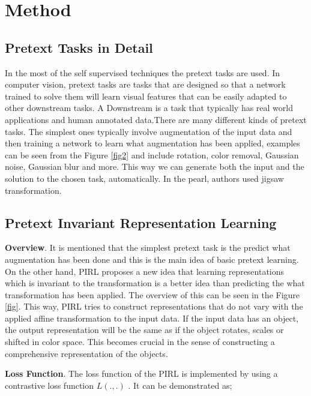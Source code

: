 \documentclass[conference]{IEEEtran}
\begin{document}
\section{Method}
\subsection{Pretext Tasks in Detail}
In the most of the self supervised techniques the pretext tasks are used. In computer vision, pretext tasks are tasks that are designed so that a network trained to solve them will learn visual features that can be easily adapted to other downstream tasks. A Downstream is a task that typically has real world applications and human annotated data.There are many different kinds of pretext tasks. The simplest ones typically involve augmentation of the input data and then training a network to learn what augmentation has been applied, examples can be seen from the Figure \ref{fig2} and include rotation, color removal, Gaussian noise, Gaussian blur and more. This way we can generate both the input and the solution to the chosen task, automatically. In the pearl, authors used jigsaw transformation.

\subsection{Pretext Invariant Representation Learning}
\textbf{Overview}. It is mentioned that the simplest pretext task is the predict what augmentation has been done and this is the main idea of basic pretext learning. On the other hand, PIRL proposes a new idea that learning representations which is invariant to the transformation is a better idea than predicting the what transformation has been applied. The overview of this can be seen in the Figure \ref{fig}. This way, PIRL tries to construct representations that do not vary with the applied affine transformation to the input data. If the input data has an object, the output representation will be the same as if the object rotates, scales or shifted in color space. This becomes crucial in the sense of constructing a comprehensive representation of the objects. 

\textbf{Loss Function}. The loss function of the PIRL is implemented by using a contrastive loss function $L(.,.)$ \cite{pirl22}. It can be demonstrated as;
\end{document}
